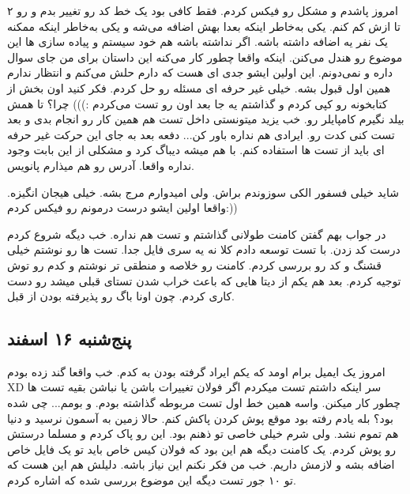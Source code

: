 امروز پاشدم و مشکل رو فیکس کردم. فقط کافی بود یک خط کد رو تغییر بدم و  رو ۲ تا ازش کم کنم. یکی به‌خاطر اینکه بعدا
بهش اضافه می‌شه و یکی به‌خاطر اینکه ممکنه یک نفر یه  اضافه داشته باشه. اگر نداشته باشه هم خود سیستم و پیاده سازی ها
این موضوع رو هندل می‌کنن. اینکه واقعا چطور کار می‌کنه این داستان برای من جای سوال داره و نمی‌دونم. این اولین ایشو جدی ای هست که
دارم حلش می‌کنم و انتظار ندارم همین اول قبول بشه. خیلی غیر حرفه ای مسئله رو حل کردم. فکر کنید اون بخش از کتابخونه رو کپی کردم
و گذاشتم یه جا بعد اون رو تست می‌کردم :))) چرا؟ تا همش بیلد نگیرم کامپایلر رو. خب یزید میتونستی داخل تست هم همین کار رو انجام بدی
و بعد تست کنی کدت رو. ایرادی هم نداره باور کن... دفعه بعد به جای این حرکت غیر حرفه ای باید از تست ها استفاده کنم. با  هم میشه
دیباگ کرد و مشکلی از این بابت وجود نداره واقعا. آدرس \cl رو هم میذارم پانویس.

شاید خیلی فسفور الکی سوزوندم براش. ولی امیدوارم مرج بشه. خیلی هیجان انگیزه. واقعا اولین ایشو درست درمونم رو فیکس کردم:))

در جواب بهم گفتن کامنت طولانی گذاشتم و تست هم نداره. خب دیگه شروع کردم درست کد زدن. با تست توسعه دادم کلا نه یه سری فایل جدا.
تست ها رو نوشتم خیلی قشنگ و کد رو بررسی کردم. کامنت رو خلاصه و منطقی تر نوشتم و کدم رو توش توجیه کردم. بعد هم یکم از دیتا هایی
که باعث خراب شدن تستای قبلی میشد رو دست کاری کردم. چون اونا باگ رو پذیرفته بودن از قبل.

\subsection{پنج‌شنبه ۱۶ اسفند}

امروز یک ایمیل برام اومد که یکم ایراد گرفته بودن به کدم. خب واقعا گند زده بودم XD سر اینکه داشتم تست میکردم اگر فولان تغییرات
باشن یا نباشن بقیه تست ها چطور کار میکنن. واسه همین خط اول تست مربوطه  گذاشته بودم. و بومم... چی شده بود؟ بله یادم رفته بود
موقع پوش کردن پاکش کنم. حالا زمین به آسمون نرسید و دنیا هم تموم نشد. ولی شرم خیلی خاصی تو ذهنم بود. این رو پاک کردم و مسلما درستش رو
پوش کردم. یک کامنت دیگه هم این بود که فولان کیس خاص باید تو یک فایل خاص اضافه بشه و لازمش داریم. خب من فکر نکنم این نیاز باشه.
دلیلش هم این هست که تو ۱۰ جور تست دیگه این موضوع بررسی شده که اشاره کردم.


